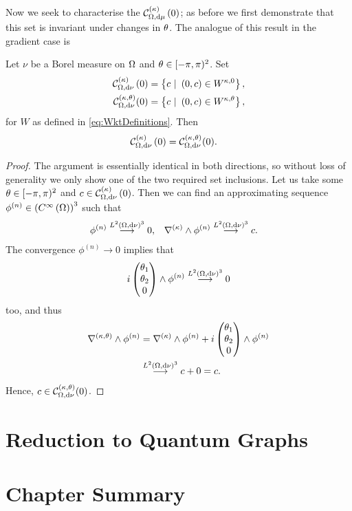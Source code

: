Now we seek to characterise the $\mathcal{C}_{ \Omega, \mathrm{d}\mu}^{(\kappa)}\left( 0 \right)$; as before we first demonstrate that this set is invariant under changes in $\theta$.
The analogue of this result in the gradient case is 
\begin{prop}
	Let $\nu$ be a Borel measure on $\Omega$ and $\theta\in[-\pi,\pi)^2$.
	Set
	\begin{align*}
		\kcurlZero{\ddom}{\nu} &= \clbracs{ c \ \vert \ \bracs{0,c}\in W^{\wavenumber, 0}}, \\
		\mathcal{C}_{\ddom, \md\nu}^{\kt}(0) &= \clbracs{ c \ \vert \ \bracs{0,c}\in W^{\wavenumber, \qm} },
	\end{align*}
	for $W$ as defined in \eqref{eq:WktDefinitions}.
	Then
	\begin{align*}
		\mathcal{C}_{ \Omega, \mathrm{d}\nu}^{(\kappa)}\left( 0 \right) &= \mathcal{C}_{\Omega, \mathrm{d}\nu}^{\left( \kappa, \theta \right)}(0).
	\end{align*}
\end{prop}
\begin{proof}
	The argument is essentially identical in both directions, so without loss of generality we only show one of the two required set inclusions.
	Let us take some $\theta\in[-\pi,\pi)^2$ and $c\in\mathcal{C}_{ \Omega, \mathrm{d}\nu}^{(\kappa)}\left( 0 \right)$.
	Then we can find an approximating sequence $\phi^{(n)}\in\left( C^{\infty}\left( \Omega \right) \right)^3$ such that
	\begin{align*}
		\phi^{(n)} \overset{L^{2}\left( \Omega,\mathrm{d}\nu \right)^3}{\longrightarrow} 0, &\quad \nabla_{}^{(\kappa)}\wedge\phi^{(n)} \overset{L^{2}\left( \Omega,\mathrm{d}\nu \right)^3}{\longrightarrow} c.
	\end{align*}
	The convergence $\phi^{(n)}\rightarrow0$ implies that 
	\begin{align*}
		i \begin{pmatrix} \theta_1 \\ \theta_2 \\ 0\end{pmatrix}\wedge\phi^{(n)}\overset{L^{2}\left( \Omega,\mathrm{d}\nu \right)^3}{\longrightarrow} 0
	\end{align*}
	too, and thus
	\begin{align*}
		\nabla_{}^{\left( \kappa, \theta \right)}\wedge\phi^{(n)} &= \nabla_{}^{(\kappa)}\wedge\phi^{(n)} + i\begin{pmatrix} \theta_1 \\ \theta_2 \\ 0\end{pmatrix}\wedge\phi^{(n)} \\
		&\overset{L^{2}\left( \Omega,\mathrm{d}\nu \right)^3}{\longrightarrow} c + 0 = c.
	\end{align*}
	Hence, $c\in \mathcal{C}_{\Omega, \mathrm{d}\nu}^{\left( \kappa, \theta \right)}(0)$.
\end{proof}

\section{Reduction to Quantum Graphs} \label{sec:CurlReductionToQG}

\section{Chapter Summary} \label{sec:CurlSummary}
